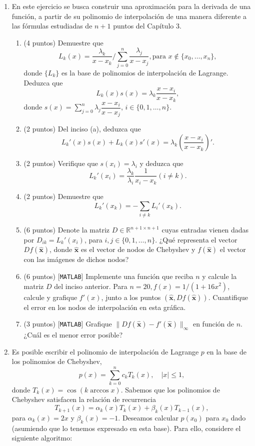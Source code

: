 \documentclass[12pt,final,twoside,notitlepage]{article}
\begin{document}
\begin{enumerate}
\item {\rm 
En este ejercicio se busca construir una aproximación para la derivada de una función, a partir de su polinomio de interpolación de una manera diferente a las fórmulas estudiadas de $n+1$ puntos del Capítulo 3.
\begin{enumerate}
\item (4 puntos) Demuestre que $$L_k(x) = \dfrac{\lambda_k}{x-x_k} \Bigg/ \sum_{j=0}^n \dfrac{\lambda_j}{x-x_j}, \text{para } x\notin \lbrace x_0,\ldots,x_n\rbrace,$$ donde $\{L_k\}$ es la base de polinomios de interpolación de Lagrange. Deduzca que $$L_k(x) s(x) = \lambda_k \dfrac{x-x_i}{x-x_k},$$ donde $\displaystyle s(x)=\sum_{j=0}^n \lambda_j \dfrac{x-x_i}{x-x_j}$, $i\in\{0,1,\ldots,n\}$. 
\item (2 puntos) Del inciso (a), deduzca que $$L_k'(x) s(x)+L_k(x) s'(x)=\lambda_k\left(\dfrac{x-x_i}{x-x_k}\right)'.$$
\item (2 puntos) Verifique que $s(x_i) =\lambda_i$ 
y deduzca que $$L_k'(x_i) = \dfrac{\lambda_k}{\lambda_i}\dfrac{1}{x_i-x_k} (i\neq k).$$
\item (2 puntos) Demuestre que $$L_k'(x_k) = -\sum_{i\neq k} L_i'(x_k).$$
\item (6 puntos) Denote la matriz $D\in\mathbb{R}^{n+1 \times n+1}$ cuyas entradas vienen dadas por $D_{ik} = L_k'(x_i)$, para $i,j\in\{0,1,\ldots,n\}$. ¿Qué representa el vector $D f(\hat{\bm{x}})$, donde $\hat{\bm{x}}$ es el vector de nodos de Chebyshev y $f(\hat{\bm{x}})$ el vector con las imágenes de dichos nodos?
\item (6 puntos) [\texttt{MATLAB}] Implemente una función que reciba $n$ y calcule la matriz $D$ del inciso anterior. Para $n=20, f(x)=1/(1+16x^2)$, calcule y grafique $f'(x)$, junto a los puntos $\left(\hat{\bm{x}}, D f(\hat{\bm{x}})\right)$. Cuantifique el error en los nodos de interpolación en esta gráfica.
\item (3 puntos) [\texttt{MATLAB}] Grafique $\|D f(\hat{\bm{x}})- f'(\hat{\bm{x}})\|_\infty$ en función de $n$. ¿Cuál es el menor error posible?
\end{enumerate}
}

\item {\rm
Es posible escribir el polinomio de interpolación de Lagrange $p$ en la base de los polinomios de Chebyshev, 
$$p(x) = \sum_{k=0}^n c_k T_k(x),\quad \vert x\vert \leq 1,$$
donde $T_k(x) = \cos(k \arccos x)$. Sabemos que los polinomios de Chebyshev satisfacen la relación de recurrencia
\begin{equation*}
T_{k+1}(x) = \alpha_k(x) T_k(x) +\beta_k(x) T_{k-1}(x),
\end{equation*}
para $\alpha_k(x)= 2x$ y $\beta_k(x) = -1$. Deseamos calcular $p(x_0)$ para $x_0$ dado (asumiendo que lo tenemos expresado en esta base). Para ello, considere el siguiente algoritmo: 

}
\end{enumerate}
\end{document}
